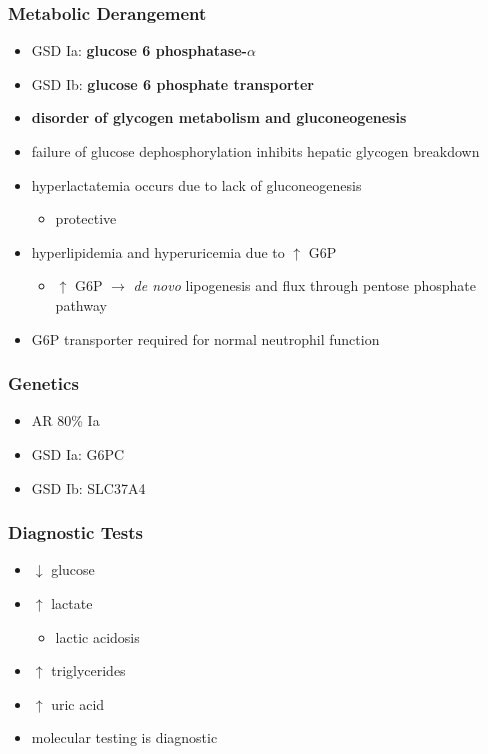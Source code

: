 \documentclass[12pt]{scrartcl}
\begin{document}
\subsubsection{Metabolic Derangement}
\label{sec:org87fc65c}
\begin{itemize}
\item GSD Ia: \textbf{glucose 6 phosphatase-\(\alpha\)}
\item GSD Ib: \textbf{glucose 6 phosphate transporter}
\item \textbf{disorder of glycogen metabolism and gluconeogenesis}
\item failure of glucose dephosphorylation inhibits hepatic glycogen breakdown
\item hyperlactatemia occurs due to lack of gluconeogenesis
\begin{itemize}
\item protective
\end{itemize}
\item hyperlipidemia and hyperuricemia due to \(\uparrow\) G6P
\begin{itemize}
\item \(\uparrow\) G6P \(\to\) \emph{de novo} lipogenesis and flux through pentose phosphate pathway
\end{itemize}
\item G6P transporter required for normal neutrophil function
\end{itemize}

\subsubsection{Genetics}
\label{sec:orgdb7be4a}
\begin{itemize}
\item AR 80\% Ia
\item GSD Ia: G6PC
\item GSD Ib: SLC37A4
\end{itemize}

\subsubsection{Diagnostic Tests}
\label{sec:org4f80dbc}
\begin{itemize}
\item \(\downarrow\) glucose
\item \(\uparrow\) lactate
\begin{itemize}
\item lactic acidosis
\end{itemize}
\item \(\uparrow\) triglycerides
\item \(\uparrow\) uric acid
\item molecular testing is diagnostic
\end{itemize}
\end{document}
